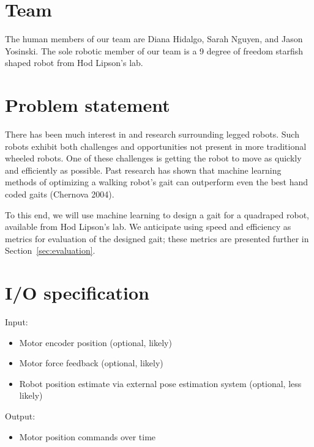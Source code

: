 \section{Team}

The human members of our team are Diana Hidalgo, Sarah Nguyen, and
Jason Yosinski.  The sole robotic member of our team is a 9 degree of
freedom starfish shaped robot from Hod Lipson's lab.



\section{Problem statement}

There has been much interest in and research surrounding legged
robots.  Such robots exhibit both challenges and opportunities not
present in more traditional wheeled robots.  One of these challenges
is getting the robot to move as quickly and efficiently as possible.
Past research has shown that machine learning methods of optimizing a
walking robot's gait can outperform even the best hand coded gaits
(Chernova 2004).

To this end, we will use machine learning to design a gait for a
quadraped robot, available from Hod Lipson's lab.  We anticipate using
speed and efficiency as metrics for evaluation of the designed gait;
these metrics are presented further in Section~\ref{sec:evaluation}.




\section{I/O specification}


Input:

\begin{itemize}
\item Motor encoder position (optional, likely)
\item Motor force feedback (optional, likely)
\item Robot position estimate via external pose estimation system (optional, less likely)
\end{itemize}

 
\noindent Output:

\begin{itemize}
\item Motor position commands over time
\end{itemize}


